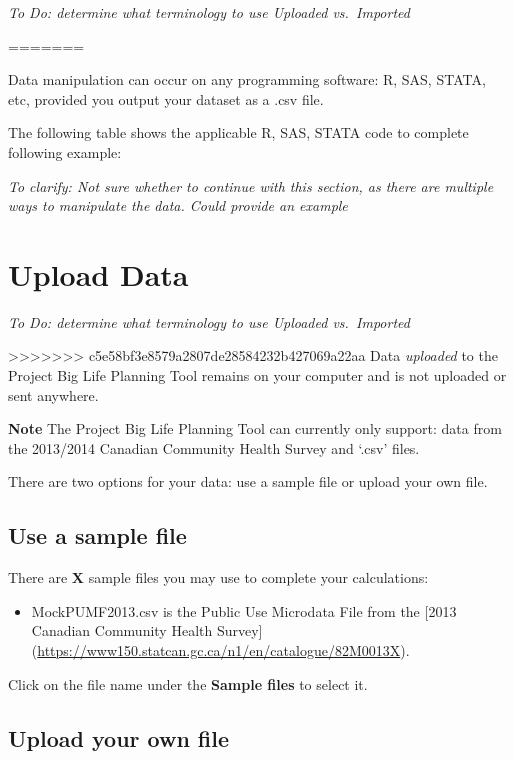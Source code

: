 \documentclass[]{book}
\providecommand{\tightlist}{%
  \setlength{\itemsep}{0pt}\setlength{\parskip}{0pt}}
\begin{document}
\emph{To Do: determine what terminology to use Uploaded vs.~Imported}

=======

Data manipulation can occur on any programming software: R, SAS, STATA,
etc, provided you output your dataset as a .csv file.

The following table shows the applicable R, SAS, STATA code to complete
following example:

\emph{To clarify: Not sure whether to continue with this section, as
there are multiple ways to manipulate the data. Could provide an
example}

\section{Upload Data}\label{upload-data}

\emph{To Do: determine what terminology to use Uploaded vs.~Imported}

>>>>>>> c5e58bf3e8579a2807de28584232b427069a22aa
Data \emph{uploaded} to the Project Big Life Planning Tool remains on
your computer and is not uploaded or sent anywhere.

\textbf{Note} The Project Big Life Planning Tool can currently only
support: data from the 2013/2014 Canadian Community Health Survey and
`.csv' files.

There are two options for your data: use a sample file or upload your
own file.

\subsection{Use a sample file}\label{use-a-sample-file}

There are \textbf{X} sample files you may use to complete your
calculations:

\begin{itemize}
\tightlist
\item
  MockPUMF2013.csv is the Public Use Microdata File from the {[}2013
  Canadian Community Health Survey{]}
  (\url{https://www150.statcan.gc.ca/n1/en/catalogue/82M0013X}).
\end{itemize}

Click on the file name under the \textbf{Sample files} to select it.

\subsection{Upload your own file}\label{upload-your-own-file}
\end{document}
